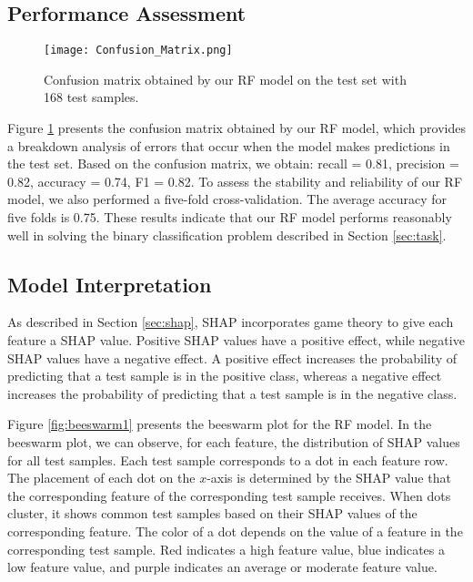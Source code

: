 \documentclass[draft]{agujournal2019}
\begin{document}
\subsection{Performance Assessment}

\begin{figure}
\centering
\hspace*{-0.7cm}
\texttt{[image: Confusion\_Matrix.png]}
\caption{Confusion matrix
obtained by our RF model on
the test set with 168 test samples.
}
\label{fig:confusion_matrix}
\end{figure}

Figure \ref{fig:confusion_matrix} presents the confusion matrix obtained by our RF model, which provides a breakdown
analysis of errors that occur
when the model makes predictions in the test set. 
Based on the confusion matrix, we obtain:
recall = 0.81,
precision = 0.82,
accuracy = 0.74,
F1 = 0.82.
To assess the stability and reliability of our RF model, we also performed a five-fold cross-validation.
The average accuracy for five folds is 0.75.
These results indicate that our RF model performs reasonably well in solving the binary classification problem described in
Section \ref{sec:task}.

\subsection{Model Interpretation}
\label{sec:SHAP}

As described in Section \ref{sec:shap}, 
SHAP incorporates game theory to give each feature a
SHAP value. Positive SHAP values have a positive effect,
while negative SHAP values have a negative effect. A positive
effect increases the probability of predicting that a test
sample is in the positive class, whereas a negative effect
increases the probability of predicting that a test sample is
in the negative class. 

Figure \ref{fig:beeswarm1} presents the beeswarm plot for the RF model. In the beeswarm plot, we can observe, for each feature, the
distribution of SHAP values for all test samples. Each test
sample corresponds to a dot in each feature row. The placement
of each dot on the $x$-axis is determined by the SHAP
value that the corresponding feature of the corresponding test sample receives. When dots cluster, it shows common test samples based on their SHAP values of the corresponding feature. 
The color of a dot depends on the value of a feature
in the corresponding test sample. Red indicates a high
feature value, blue indicates a low feature value, and purple
indicates an average or moderate feature value.
\end{document}

